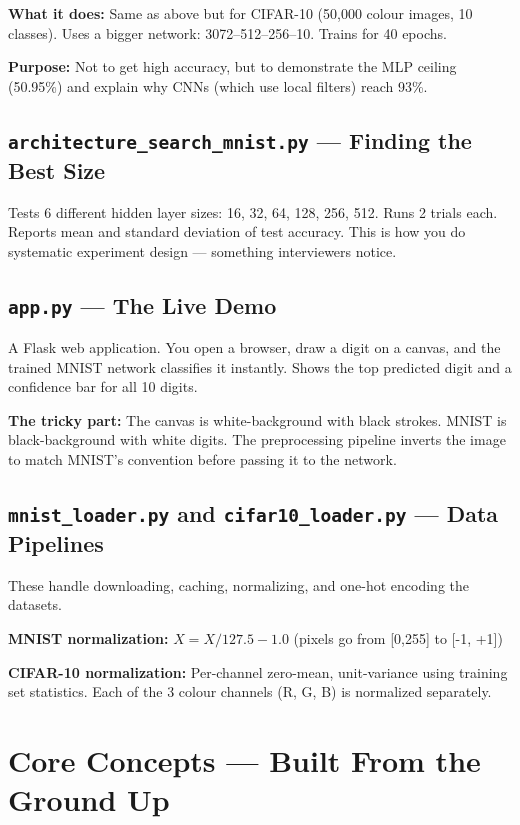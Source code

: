 \documentclass[12pt, a4paper]{article}
\begin{document}
\textbf{What it does:} Same as above but for CIFAR-10 (50,000 colour images, 10 classes). Uses a bigger network: 3072--512--256--10. Trains for 40 epochs.

\textbf{Purpose:} Not to get high accuracy, but to demonstrate the MLP ceiling (50.95\%) and explain why CNNs (which use local filters) reach 93\%.

\subsection{\texttt{architecture\_search\_mnist.py} --- Finding the Best Size}

Tests 6 different hidden layer sizes: 16, 32, 64, 128, 256, 512. Runs 2 trials each. Reports mean and standard deviation of test accuracy. This is how you do systematic experiment design --- something interviewers notice.

\subsection{\texttt{app.py} --- The Live Demo}

A Flask web application. You open a browser, draw a digit on a canvas, and the trained MNIST network classifies it instantly. Shows the top predicted digit and a confidence bar for all 10 digits.

\textbf{The tricky part:} The canvas is white-background with black strokes. MNIST is black-background with white digits. The preprocessing pipeline inverts the image to match MNIST's convention before passing it to the network.

\subsection{\texttt{mnist\_loader.py} and \texttt{cifar10\_loader.py} --- Data Pipelines}

These handle downloading, caching, normalizing, and one-hot encoding the datasets.

\textbf{MNIST normalization:} $X = X/127.5 - 1.0$ (pixels go from [0,255] to [-1, +1])

\textbf{CIFAR-10 normalization:} Per-channel zero-mean, unit-variance using training set statistics. Each of the 3 colour channels (R, G, B) is normalized separately.

\section{Core Concepts --- Built From the Ground Up}
\end{document}
